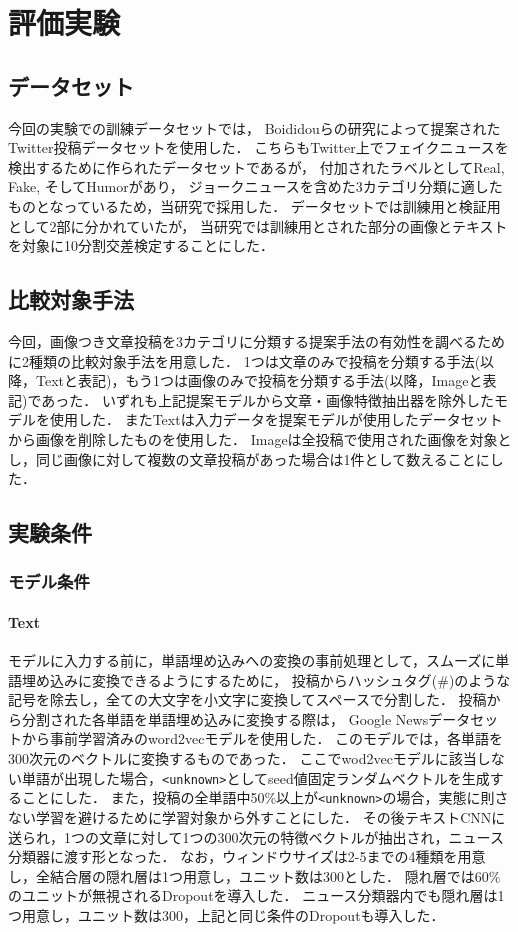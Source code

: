 %
\chapter{評価実験}
%
\section{データセット}
今回の実験での訓練データセットでは，
Boididouらの研究\cite{boididou2015verifying}によって提案されたTwitter投稿データセットを使用した．
こちらもTwitter上でフェイクニュースを検出するために作られたデータセットであるが，
付加されたラベルとしてReal, Fake, そしてHumorがあり，
ジョークニュースを含めた3カテゴリ分類に適したものとなっているため，当研究で採用した．
データセットでは訓練用と検証用として2部に分かれていたが，
当研究では訓練用とされた部分の画像とテキストを対象に10分割交差検定することにした．

% 
\section{比較対象手法}
今回，画像つき文章投稿を3カテゴリに分類する提案手法の有効性を調べるために2種類の比較対象手法を用意した．
1つは文章のみで投稿を分類する手法(以降，Textと表記)，もう1つは画像のみで投稿を分類する手法(以降，Imageと表記)であった．
いずれも上記提案モデルから文章・画像特徴抽出器を除外したモデルを使用した．
またTextは入力データを提案モデルが使用したデータセットから画像を削除したものを使用した．
Imageは全投稿で使用された画像を対象とし，同じ画像に対して複数の文章投稿があった場合は1件として数えることにした．
% 
\section{実験条件}
%
\subsection{モデル条件}
\subsubsection{Text}
モデルに入力する前に，単語埋め込みへの変換の事前処理として，スムーズに単語埋め込みに変換できるようにするために，
投稿からハッシュタグ(\#)のような記号を除去し，全ての大文字を小文字に変換してスペースで分割した．
投稿から分割された各単語を単語埋め込みに変換する際は，
Google Newsデータセットから事前学習済みのword2vecモデル\cite{google_2013}を使用した．
このモデルでは，各単語を300次元のベクトルに変換するものであった．
ここでwod2vecモデルに該当しない単語が出現した場合，\texttt{<unknown>}としてseed値固定ランダムベクトルを生成することにした．
また，投稿の全単語中50\%以上が\texttt{<unknown>}の場合，実態に則さない学習を避けるために学習対象から外すことにした．
その後テキストCNNに送られ，1つの文章に対して1つの300次元の特徴ベクトルが抽出され，ニュース分類器に渡す形となった．
なお，ウィンドウサイズは2-5までの4種類を用意し，全結合層の隠れ層は1つ用意し，ユニット数は300とした．
隠れ層では60\%のユニットが無視されるDropoutを導入した．
ニュース分類器内でも隠れ層は1つ用意し，ユニット数は300，上記と同じ条件のDropoutも導入した．
%
